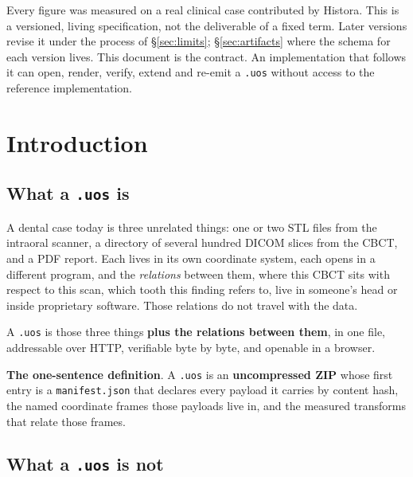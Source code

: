 \documentclass[11pt,a4paper]{article}
\newcommand{\code}[1]{\texttt{\small #1}}
\begin{document}
\begin{titlepage}
\vspace{0.8cm}
{\color{uosgrey}\small Every figure was measured on a real clinical case
contributed by Histora. This is a versioned, living specification, not the deliverable
of a fixed term. Later versions revise it under the process of
\S\ref{sec:limits}; \S\ref{sec:artifacts} where the schema for each
version lives. This document is the contract. An implementation that follows it
can open, render, verify, extend and re-emit a \code{.uos} without access to the
reference implementation.}
\vspace{1.5cm}
\end{titlepage}

\tableofcontents
\newpage

\section{Introduction}\label{sec:intro}

\subsection{What a \code{.uos} is}
A dental case today is three unrelated things: one or two STL files from the intraoral
scanner, a directory of several hundred DICOM slices from the CBCT, and a PDF report.
Each lives in its own coordinate system, each opens in a different program, and the
\emph{relations} between them, where this CBCT sits with respect to this scan, which
tooth this finding refers to, live in someone's head or inside proprietary software.
Those relations do not travel with the data.

A \code{.uos} is those three things \textbf{plus the relations between them}, in one
file, addressable over HTTP, verifiable byte by byte, and openable in a browser.

\textbf{The one-sentence definition}. A \code{.uos} is an \textbf{uncompressed ZIP} whose first entry is a \code{manifest.json} that declares every payload it carries by content hash, the named coordinate frames those
payloads live in, and the measured transforms that relate those frames.

\subsection{What a \code{.uos} is not}
\end{document}
